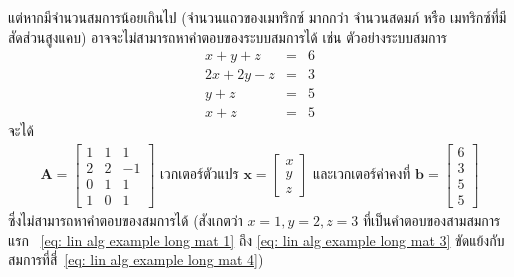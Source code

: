 แต่หากมีจำนวนสมการน้อยเกินไป 
(จำนวนแถวของเมทริกซ์ มากกว่า จำนวนสดมภ์ หรือ เมทริกซ์ที่มีสัดส่วนสูงแคบ)
อาจจะไม่สามารถหาคำตอบของระบบสมการได้
เช่น ตัวอย่างระบบสมการ
\begin{eqnarray}
x + y + z &=& 6 
\label{eq: lin alg example long mat 1} \\
2 x + 2 y - z &=& 3
\label{eq: lin alg example long mat 2} \\
y + z &=& 5
\label{eq: lin alg example long mat 3} \\
x + z &=& 5
\label{eq: lin alg example long mat 4}
\end{eqnarray}
จะได้ 
\begin{eqnarray}
\bm{A} = 
\begin{bmatrix}
1 & 1 & 1 \\
2 & 2 & -1 \\
0 & 1 & 1 \\
1 & 0 & 1 
\end{bmatrix}
\mbox{ เวกเตอร์ตัวแปร }
%
\bm{x} = 
\begin{bmatrix}
x \\
y \\
z
\end{bmatrix}
\mbox{ และเวกเตอร์ค่าคงที่ }
\bm{b} =
\begin{bmatrix}
6 \\
3 \\
5 \\
5 
\end{bmatrix}
\nonumber
\end{eqnarray}
ซึ่งไม่สามารถหาคำตอบของสมการได้ (สังเกตว่า $x = 1, y = 2, z = 3$ ที่เป็นคำตอบของสามสมการแรก ~\ref{eq: lin alg example long mat 1} ถึง
\ref{eq: lin alg example long mat 3}
ขัดแย้งกับสมการที่สี่~\ref{eq: lin alg example long mat 4})

